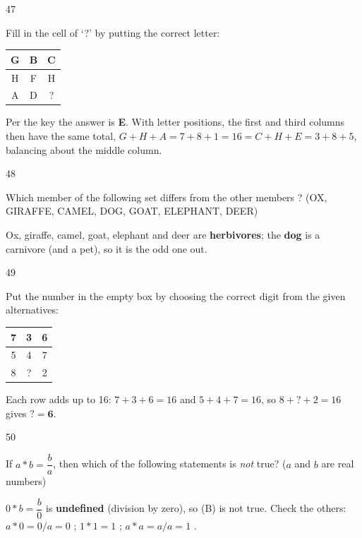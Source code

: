 \begin{question}{47}
{Fill in the cell of `?' by putting the correct letter:\\[3pt]
\centering\begin{tabular}{|c|c|c|}\hline G & B & C\\\hline H & F & H\\\hline A & D & ?\\\hline\end{tabular}\par}
\begin{explain}
Per the key the answer is \textbf{E}. With letter positions, the first and third columns then have the same total, $G+H+A=7+8+1=16=C+H+E=3+8+5$, balancing about the middle column.
\end{explain}
\end{question}

\begin{question}{48}
{Which member of the following set differs from the other members ? (OX, GIRAFFE, CAMEL, DOG, GOAT, ELEPHANT, DEER)\par}
\begin{explain}
Ox, giraffe, camel, goat, elephant and deer are \textbf{herbivores}; the \textbf{dog} is a carnivore (and a pet), so it is the odd one out.
\end{explain}
\end{question}

\begin{question}{49}
{Put the number in the empty box by choosing the correct digit from the given alternatives:\\[3pt]
\centering\begin{tabular}{|c|c|c|}\hline 7 & 3 & 6\\\hline 5 & 4 & 7\\\hline 8 & ? & 2\\\hline\end{tabular}\par}
\begin{explain}
Each row adds up to 16: $7+3+6=16$ and $5+4+7=16$, so $8+?+2=16$ gives $?=\mathbf{6}$.
\end{explain}
\end{question}

\begin{question}{50}
{If $a*b=\dfrac{b}{a}$, then which of the following statements is \emph{not} true? ($a$ and $b$ are real numbers)\par}
\begin{explain}
$0*b=\dfrac{b}{0}$ is \textbf{undefined} (division by zero), so (B) is not true.
Check the others: $a*0=0/a=0$ \checkmark; $1*1=1$ \checkmark; $a*a=a/a=1$ \checkmark.
\end{explain}
\end{question}

